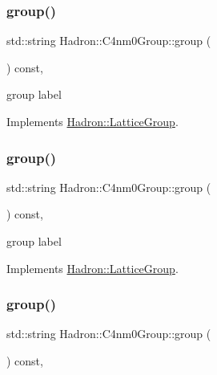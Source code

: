 \subsubsection{\texorpdfstring{group()}{group()}\hspace{0.1cm}{\footnotesize\ttfamily [1/3]}}
{\footnotesize\ttfamily std\+::string Hadron\+::\+C4nm0\+Group\+::group (\begin{DoxyParamCaption}{ }\end{DoxyParamCaption}) const\hspace{0.3cm}{\ttfamily [inline]}, {\ttfamily [virtual]}}

group label 

Implements \mbox{\hyperlink{structHadron_1_1LatticeGroup_a82208a322bf1b1db489f16af38e70087}{Hadron\+::\+Lattice\+Group}}.

\mbox{\label{structHadron_1_1C4nm0Group_a2a84060776245ed0045a7271b00064eb}} 
\subsubsection{\texorpdfstring{group()}{group()}\hspace{0.1cm}{\footnotesize\ttfamily [2/3]}}
{\footnotesize\ttfamily std\+::string Hadron\+::\+C4nm0\+Group\+::group (\begin{DoxyParamCaption}{ }\end{DoxyParamCaption}) const\hspace{0.3cm}{\ttfamily [inline]}, {\ttfamily [virtual]}}

group label 

Implements \mbox{\hyperlink{structHadron_1_1LatticeGroup_a82208a322bf1b1db489f16af38e70087}{Hadron\+::\+Lattice\+Group}}.

\mbox{\label{structHadron_1_1C4nm0Group_a2a84060776245ed0045a7271b00064eb}} 
\subsubsection{\texorpdfstring{group()}{group()}\hspace{0.1cm}{\footnotesize\ttfamily [3/3]}}
{\footnotesize\ttfamily std\+::string Hadron\+::\+C4nm0\+Group\+::group (\begin{DoxyParamCaption}{ }\end{DoxyParamCaption}) const\hspace{0.3cm}{\ttfamily [inline]}, {\ttfamily [virtual]}}

